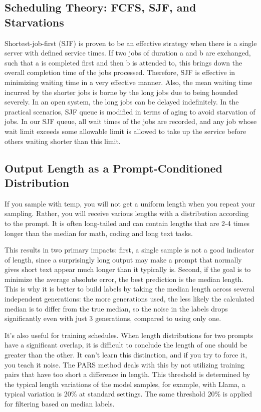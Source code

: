 \documentclass[conference]{IEEEtran}
\begin{document}
\subsection{Scheduling Theory: FCFS, SJF, and Starvations}

Shortest-job-first (SJF) is proven to be an effective strategy when there is a single server with defined service times. If two jobs of duration a and b are exchanged, such that a is completed first and then b is attended to, this brings down the overall completion time of the jobs processed. Therefore, SJF is effective in minimizing waiting time in a very effective manner. Also, the mean waiting time incurred by the shorter jobs is borne by the long jobs due to being hounded severely. In an open system, the long jobs can be delayed indefinitely. In the practical scenarios, SJF queue is modified in terms of aging to avoid starvation of jobs. In our SJF queue, all wait times of the jobs are recorded, and any job whose wait limit exceeds some allowable limit is allowed to take up the service before others waiting shorter than this limit.

\subsection{Output Length as a Prompt-Conditioned Distribution}
If you sample with temp, you will not get a uniform length when you repeat your sampling. Rather, you will receive various lengths with a distribution according to the prompt. It is often long-tailed and can contain lengths that are 2-4 times longer than the median for math, coding and long text tasks.

This results in two primary impacts: first, a single sample is not a good indicator of length, since a surprisingly long output may make a prompt that normally gives short text appear much longer than it typically is. Second, if the goal is to minimize the average absolute error, the best prediction is the median length. This is why it is better to build labels by taking the median length across several independent generations: the more generations used, the less likely the calculated median is to differ from the true median, so the noise in the labels drops significantly even with just 3 generations, compared to using only one.

It's also useful for training schedules. When length distributions for two prompts have a significant overlap, it is difficult to conclude the length of one should be greater than the other. It can't learn this distinction, and if you try to force it, you teach it noise. The PARS method deals with this by not utilizing training pairs that have too short a difference in length. This threshold is determined by the typical length variations of the model samples, for example, with Llama, a typical variation is 20\% at standard settings. The same threshold 20\% is applied for filtering based on median labels.
\end{document}
